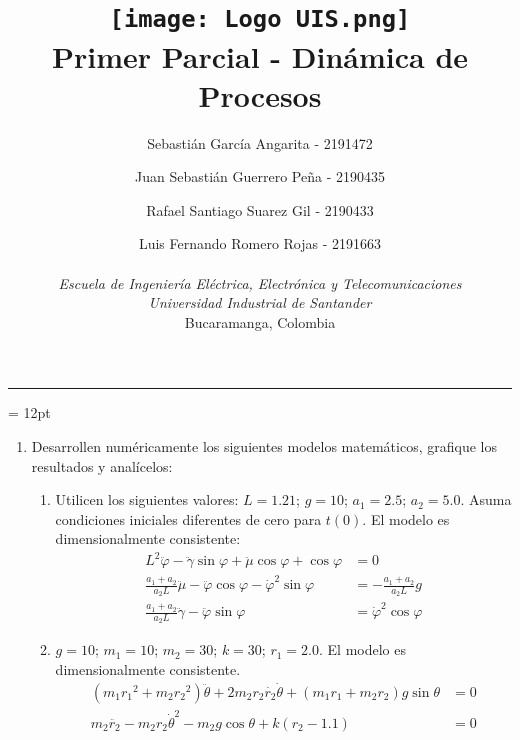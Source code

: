 \documentclass[letterpaper, 12pt]{article}
\title{\protect\vspace{-0.5cm}\protect\texttt{[image: Logo UIS.png]} \\
Primer Parcial - Dinámica de Procesos}
\author{Sebastián García Angarita - 2191472\and
        Juan Sebastián Guerrero Peña - 2190435\and
        Rafael Santiago Suarez Gil - 2190433\and
        Luis Fernando Romero Rojas - 2191663 \\ \\
        \textit{Escuela de Ingeniería Eléctrica, Electrónica y Telecomunicaciones} \\
        \textit{Universidad Industrial de Santander}\\
        Bucaramanga, Colombia \\}
\date{}
\begin{document}
\maketitle
\begin{center}\rule{0.9\linewidth}{0.5pt}\end{center}
\parskip = 12pt

\begin{enumerate}
\item Desarrollen numéricamente los siguientes modelos matemáticos, grafique los resultados y analícelos:
\begin{enumerate}
\item Utilicen los siguientes valores:
$L = 1.21$; $g = 10$; $a_1 = 2.5$; $a_2 = 5.0$. Asuma condiciones iniciales diferentes de cero para $t(0)$. El modelo es dimensionalmente consistente:
\begin{equation}
\begin{split}
    L^2\ddot{\varphi} - \ddot{\gamma}\sin \varphi + \ddot{\mu}\cos \varphi + \cos \varphi &= 0 \\
    \frac{a_1+a_2}{a_2L}\ddot{\mu} - \ddot{\varphi}\cos \varphi - \dot{\varphi}^2\sin \varphi &= - \frac{a_1+a_2}{a_2L}g \\
    \frac{a_1+a_2}{a_2L}\ddot{\gamma} - \ddot{\varphi}\sin \varphi &= \dot{\varphi}^2\cos \varphi
\end{split}
\end{equation}







\item $g = 10$; $m_1 = 10$; $m_2 = 30$; $k = 30$; $r_1 = 2.0$. El modelo es dimensionalmente consistente.
\begin{equation}
\begin{split}
    \left(m_1{r_1}^2 + m_2{r_2}^2\right)\ddot{\theta} + 2m_2r_2\dot{r_2}\dot{\theta} + \left(m_1r_1 + m_2r_2\right)g\sin \theta &= 0 \\
    m_2\ddot{r_2} - m_2r_2{\dot{\theta}}^2 - m_2g\cos \theta + k\left(r_2 - 1.1\right) &= 0
\end{split}
\end{equation}










\end{enumerate}
\end{enumerate}
\end{document}
